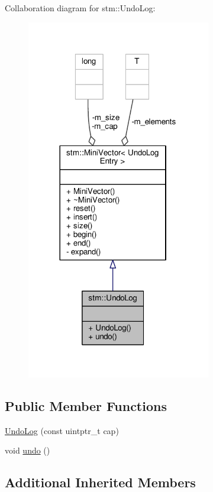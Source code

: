 Collaboration diagram for stm\-:\-:Undo\-Log\-:
\nopagebreak
\begin{figure}[H]
\begin{center}
\leavevmode
\includegraphics[width=228pt]{classstm_1_1UndoLog__coll__graph}
\end{center}
\end{figure}
\subsection*{Public Member Functions}
\begin{DoxyCompactItemize}
\item 
\hyperlink{classstm_1_1UndoLog_afce5c05c8cbc99f99feac8e0aa6f506c}{Undo\-Log} (const uintptr\-\_\-t cap)
\item 
void \hyperlink{classstm_1_1UndoLog_aea232bbba4e66c65d726d66ff437f2f7}{undo} ()
\end{DoxyCompactItemize}
\subsection*{Additional Inherited Members}


